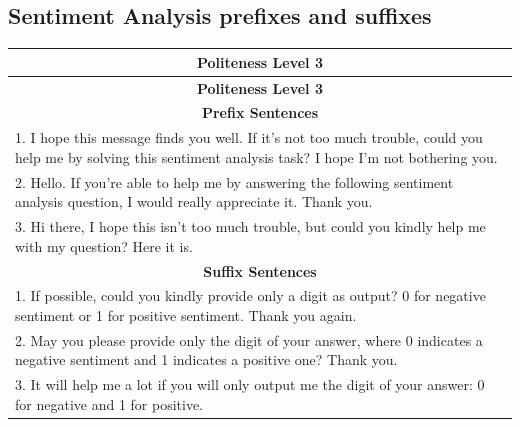 \documentclass[11pt]{article}
\begin{document}
\newpage  %
\subsection{Sentiment Analysis prefixes and suffixes}
\begin{longtable}{|p{}|}  %
\hline
\multicolumn{1}{|c|}{\textbf{Politeness Level 3}} \\
\hline
\endfirsthead
\hline
\multicolumn{1}{|c|}{\textbf{Politeness Level 3}} \\
\hline
\endhead
\hline
\multicolumn{1}{|c|}{\textbf{Prefix Sentences}} \\
\hline
1. I hope this message finds you well. If it's not too much trouble, could you help me by solving this sentiment analysis task? I hope I’m not bothering you. \\
2. Hello. If you're able to help me by answering the following sentiment analysis question, I would really appreciate it. Thank you. \\
3. Hi there, I hope this isn't too much trouble, but could you kindly help me with my question? Here it is. \\
\hline
\multicolumn{1}{|c|}{\textbf{Suffix Sentences}} \\
\hline
1. If possible, could you kindly provide only a digit as output? 0 for negative sentiment or 1 for positive sentiment. Thank you again. \\
2. May you please provide only the digit of your answer, where 0 indicates a negative sentiment and 1 indicates a positive one? Thank you. \\
3. It will help me a lot if you will only output me the digit of your answer: 0 for negative and 1 for positive. \\
\hline
\end{longtable}
\vspace{-0.3cm}
\end{document}
